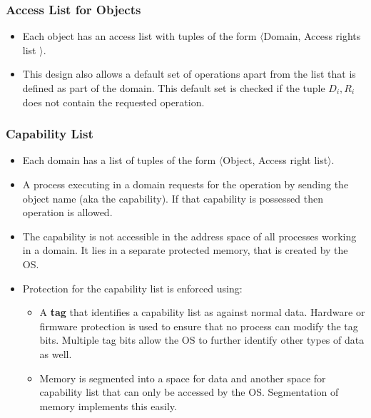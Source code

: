 \documentclass{article}
\theoremstyle{plain}
\theoremstyle{definition}
\begin{document}
\subsubsection{Access List for Objects}
\begin{itemize}
    \item Each object has an access list with tuples of the form $\langle$Domain, Access rights list $\rangle$. 
    
    \item This design also allows a default set of operations apart from the list that is defined as part of the domain. This default set is checked if the tuple $D_i, R_i$ does not contain the requested operation. 
\end{itemize}

\subsubsection{Capability List}
\begin{itemize}
    \item Each domain has a list of tuples of the form $\langle$Object, Access right list$\rangle$. 
    
    \item A process executing in a domain requests for the operation by sending the object name (aka the capability). If that capability is possessed then operation is allowed.
    
    \item The capability is not accessible in the address space of all processes working in a domain. It lies in a separate protected memory, that is created by the OS. 
    
    \item Protection for the capability list is enforced using:
    \begin{itemize}
        \item A \textbf{tag} that identifies a capability list as against normal data. Hardware or firmware protection is used to ensure that no process can modify the tag bits. Multiple tag bits allow the OS to further identify other types of data as well. 
        
        \item Memory is segmented into a space for data and another space for capability list that can only be accessed by the OS. Segmentation of memory implements this easily. 
    \end{itemize}
\end{itemize}
\end{document}
